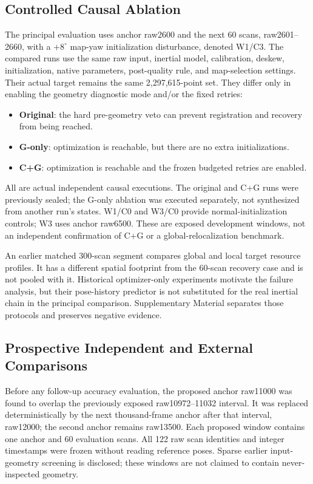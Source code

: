 \documentclass[journal,10pt,letterpaper]{IEEEtran}
\begin{document}
\subsection{Controlled Causal Ablation}
The principal evaluation uses anchor raw2600 and the next 60 scans, raw2601--2660, with a $+8^\circ$ map-yaw initialization disturbance, denoted W1/C3. The compared runs use the same raw input, inertial model, calibration, deskew, initialization, native parameters, post-quality rule, and map-selection settings. Their actual target remains the same 2,297,615-point set. They differ only in enabling the geometry diagnostic mode and/or the fixed retries:
\begin{itemize}
 \item \textbf{Original}: the hard pre-geometry veto can prevent registration and recovery from being reached.
 \item \textbf{G-only}: optimization is reachable, but there are no extra initializations.
 \item \textbf{C+G}: optimization is reachable and the frozen budgeted retries are enabled.
\end{itemize}
All are actual independent causal executions. The original and C+G runs were previously sealed; the G-only ablation was executed separately, not synthesized from another run's states. W1/C0 and W3/C0 provide normal-initialization controls; W3 uses anchor raw6500. These are exposed development windows, not an independent confirmation of C+G or a global-relocalization benchmark.

An earlier matched 300-scan segment compares global and local target resource profiles. It has a different spatial footprint from the 60-scan recovery case and is not pooled with it. Historical optimizer-only experiments motivate the failure analysis, but their pose-history predictor is not substituted for the real inertial chain in the principal comparison. Supplementary Material separates those protocols and preserves negative evidence.

\subsection{Prospective Independent and External Comparisons}
Before any follow-up accuracy evaluation, the proposed anchor raw11000 was found to overlap the previously exposed raw10972--11032 interval. It was replaced deterministically by the next thousand-frame anchor after that interval, raw12000; the second anchor remains raw13500. Each proposed window contains one anchor and 60 evaluation scans. All 122 raw scan identities and integer timestamps were frozen without reading reference poses. Sparse earlier input-geometry screening is disclosed; these windows are not claimed to contain never-inspected geometry.
\end{document}
